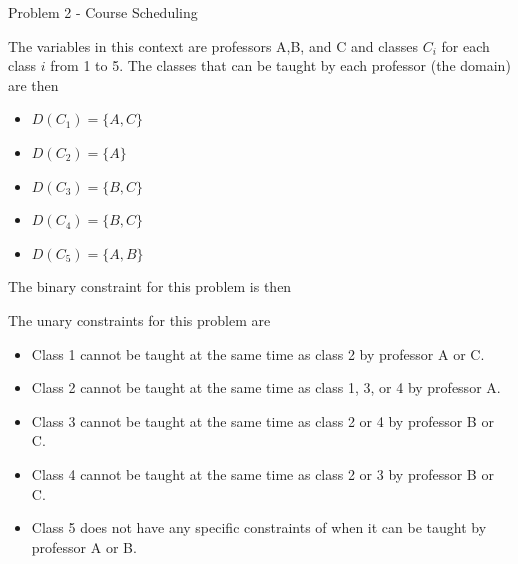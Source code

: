 \begin{problem}{Problem 2 - Course Scheduling}
    \clearpage

    \begin{highlight}
        The variables in this context are professors A,B, and C and classes $C_{i}$ for each class $i$ from 1 to 5. The classes that can be taught by each professor (the domain) are then

        \begin{itemize}
            \item $D(C_{1}) = \{A,C\}$
            \item $D(C_{2}) = \{A\}$
            \item $D(C_{3}) = \{B,C\}$
            \item $D(C_{4}) = \{B,C\}$
            \item $D(C_{5}) = \{A,B\}$
        \end{itemize}
        The binary constraint for this problem is then

        \begin{center}
            \begin{highlightbox}
            \end{highlightbox}
        \end{center}
        The unary constraints for this problem are

        \begin{center}
            \begin{highlightenv}[15cm]
                \begin{itemize}
                    \item Class 1 cannot be taught at the same time as class 2 by professor A or C.
                    \item Class 2 cannot be taught at the same time as class 1, 3, or 4 by professor A.
                    \item Class 3 cannot be taught at the same time as class 2 or 4 by professor B or C.
                    \item Class 4 cannot be taught at the same time as class 2 or 3 by professor B or C.
                    \item Class 5 does not have any specific constraints of when it can be taught by professor A or B.
                \end{itemize}
            \end{highlightenv}
        \end{center}
    \end{highlight}


\end{problem}
